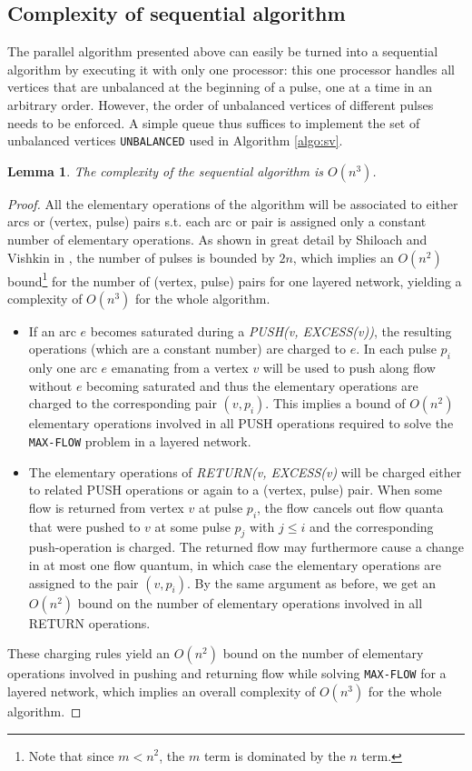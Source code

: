 \documentclass[a4paper,10pt, twocolumn]{article}
\newtheorem{lemma}{Lemma}
\begin{document}
\subsection{Complexity of sequential algorithm}
\label{sec:sv_seq}
The parallel algorithm presented above can easily be turned into a sequential algorithm by executing it with only one processor: this one processor handles all vertices that are unbalanced at the beginning of a pulse, one at a time in an arbitrary order. However, the order of unbalanced vertices of different pulses needs to be enforced. A simple queue thus suffices to implement the set of unbalanced vertices \lstinline|UNBALANCED| used in Algorithm \ref{algo:sv}.

\begin{lemma}
The complexity of the sequential algorithm is $O(n^{3})$\cite{yossi81}.
\end{lemma}
\begin{proof}
All the elementary operations of the algorithm will be associated to either arcs or (vertex, pulse) pairs s.t. each arc or pair is assigned only a constant number of elementary operations. As shown in great detail by Shiloach and Vishkin in \cite{yossi81}, the number of pulses is bounded by $2n$, which implies an $O(n^{2})$  bound\footnote{Note that since $m < n^2$, the $m$ term is dominated by the $n$ term.} for the number of (vertex, pulse) pairs for one layered network, yielding a complexity of $O(n^{3})$ for the whole algorithm.

\begin{itemize}
	\item If an arc $e$ becomes saturated during a \emph{PUSH(v, EXCESS(v))}, the resulting operations (which are a constant number) are charged to $e$. In each pulse $p_i$ only one arc $e$ emanating from a vertex $v$ will be used to push along flow without $e$ becoming saturated and thus the elementary operations are charged to the corresponding pair $(v, p_i)$. This implies a bound of $O(n^2)$ elementary operations involved in all PUSH operations required to solve the \lstinline|MAX-FLOW| problem in a layered network.
	\item The elementary operations of \emph{RETURN(v, EXCESS(v)} will be charged either to related PUSH operations or again to a (vertex, pulse) pair. When some flow is returned from vertex $v$ at pulse $p_i$, the flow cancels out flow quanta that were pushed to $v$ at some pulse $p_j$ with $j \leq i$ and the corresponding push-operation is charged. The returned flow may furthermore cause a change in at most one flow quantum, in which case the elementary operations are assigned to the pair $(v, p_i)$. By the same argument as before, we get an $O(n^{2})$ bound on the number of elementary operations involved in all RETURN operations.
\end{itemize}

These charging rules yield an $O(n^{2})$ bound on the number of elementary operations involved in pushing and returning flow while solving \lstinline|MAX-FLOW| for a layered network, which implies an overall complexity of $O(n^{3})$ for the whole algorithm. 
\end{proof}
\end{document}
